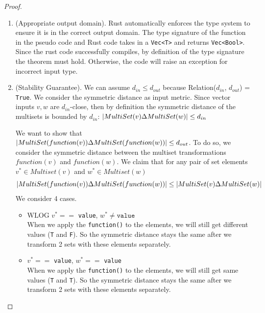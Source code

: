 \documentclass[11pt,a4paper]{article}
\begin{document}
\begin{proof}
\begin{enumerate}
\item \textup{(Appropriate output domain).} Rust automatically enforces the type system to ensure it is in the correct output domain. The type signature of the function in the pseudo code and Rust code takes in a \texttt{Vec<T>} and returns \texttt{Vec<Bool>}. Since the rust code successfully compiles, by definition of the type signature the theorem must hold. Otherwise, the code will raise an exception for incorrect input type.



\item \textup{(Stability Guarantee).}
We can assume $d_{in} \leq d_{out}$ because Relation($d_{in}$, $d_{out}$) = \texttt{True}. We consider the symmetric distance as input metric. Since vector inputs $v, w$ are $d_{in}$-close, then by definition the symmetric distance of the multisets is bounded by $d_{in}$: $\abs{MultiSet(v) \Delta MultiSet(w)} \leq d_{in}$ 


We want to show that $\abs{MultiSet(function(v)) \Delta MultiSet(function(w))} \leq d_{out}$. %
To do so, we consider the symmetric distance between the multiset transformations $function(v)$ and $function(w)$. We claim that for any pair of set elements $v^* \in Multiset(v)$ and $w^* \in Multiset(w)$ $$\abs{MultiSet(function(v)) \Delta MultiSet(function(w))} \leq \abs{MultiSet(v) \Delta MultiSet(w)}$$
We consider 4 cases. 
\begin{itemize}
    \item WLOG $v^* ==$ \texttt{value}, $w^* \neq \texttt{value}$ \\
    When we apply the \texttt{function()} to the elements, we will still get different values (\texttt{T} and \texttt{F}). So the symmetric distance stays the same after we transform 2 sets with these elements separately.
    
    \item $v^* == $ \texttt{value}, $w^* == $ \texttt{value} \\
    When we apply the \texttt{function()} to the elements, we will still get same values (\texttt{T} and \texttt{T}). So the symmetric distance stays the same after we transform 2 sets with these elements separately.
    

\end{itemize}
\end{enumerate}
\end{proof}
\end{document}
